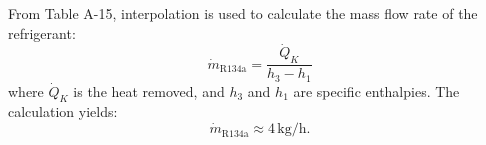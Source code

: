 From Table A-15, interpolation is used to calculate the mass flow rate of the refrigerant:  
\[
\dot{m}_{\text{R134a}} = \frac{\dot{Q}_K}{h_3 - h_1}
\]  
where \( \dot{Q}_K \) is the heat removed, and \( h_3 \) and \( h_1 \) are specific enthalpies.  
The calculation yields:  
\[
\dot{m}_{\text{R134a}} \approx 4 \, \text{kg/h}.
\]